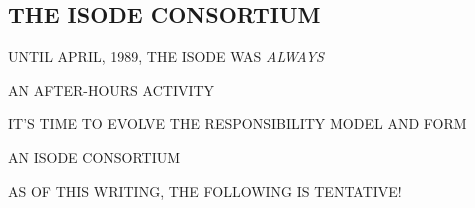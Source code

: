 




\begin{bwslide}
\part*	{THE ISODE CONSORTIUM}\bf

\begin{nrtc}
\item	UNTIL APRIL, 1989, THE ISODE WAS \emph{ALWAYS}
    \begin{nrtc}
    \item	AN AFTER-HOURS ACTIVITY
    \end{nrtc}

\item	IT'S TIME TO EVOLVE THE RESPONSIBILITY MODEL AND FORM
    \begin{nrtc}
    \item	AN ISODE CONSORTIUM
    \end{nrtc}

\item	AS OF THIS WRITING, THE FOLLOWING IS TENTATIVE!
\end{nrtc}
\end{bwslide}



